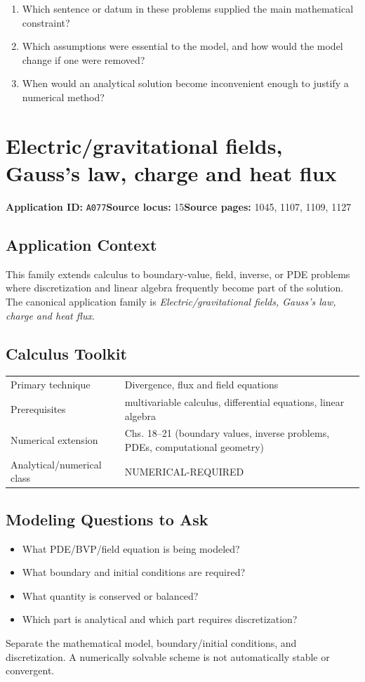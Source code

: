 \documentclass[11pt]{book}
\newcommand{\pid}[1]{\texttt{#1}}
\begin{document}
\begin{reflectionbox}\begin{enumerate}
\item Which sentence or datum in these problems supplied the main mathematical constraint?
\item Which assumptions were essential to the model, and how would the model change if one were removed?
\item When would an analytical solution become inconvenient enough to justify a numerical method?
\end{enumerate}\end{reflectionbox}
\chapter{Electric/gravitational fields, Gauss's law, charge and heat flux}\label{app:A077}
\textbf{Application ID:} \pid{A077}\quad \textbf{Source locus:} 15\quad \textbf{Source pages:} 1045, 1107, 1109, 1127
\section*{Application Context}
This family extends calculus to boundary-value, field, inverse, or PDE problems where discretization and linear algebra frequently become part of the solution. The canonical application family is \emph{Electric/gravitational fields, Gauss's law, charge and heat flux}.
\section*{Calculus Toolkit}
\begin{tabularx}{\textwidth}{@{}lX@{}}\toprule
Primary technique & Divergence, flux and field equations \\
Prerequisites & multivariable calculus, differential equations, linear algebra \\
Numerical extension & Chs. 18–21 (boundary values, inverse problems, PDEs, computational geometry) \\
Analytical/numerical class & NUMERICAL-REQUIRED \\
\bottomrule\end{tabularx}
\section*{Modeling Questions to Ask}\begin{itemize}
\item What PDE/BVP/field equation is being modeled?
\item What boundary and initial conditions are required?
\item What quantity is conserved or balanced?
\item Which part is analytical and which part requires discretization?
\end{itemize}
\begin{errorbox}Separate the mathematical model, boundary/initial conditions, and discretization. A numerically solvable scheme is not automatically stable or convergent.\end{errorbox}
\end{document}

